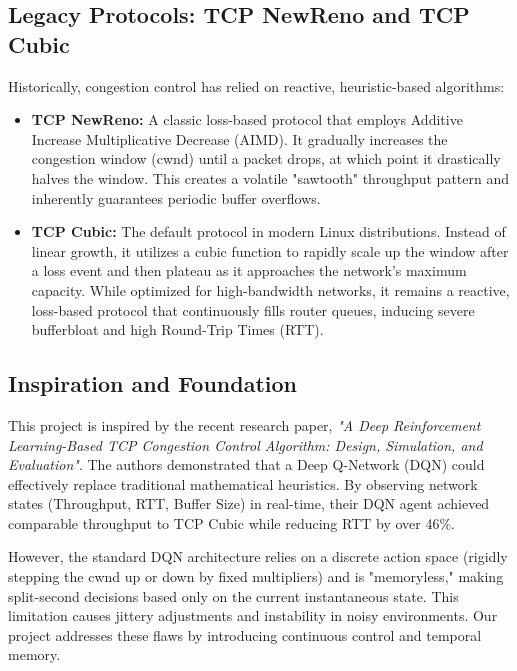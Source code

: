 \documentclass[12pt, a4paper]{article}
\begin{document}
\subsection{Legacy Protocols: TCP NewReno and TCP Cubic}
Historically, congestion control has relied on reactive, heuristic-based algorithms:
\begin{itemize}
    \item \textbf{TCP NewReno:} A classic loss-based protocol that employs Additive Increase Multiplicative Decrease (AIMD). It gradually increases the congestion window (cwnd) until a packet drops, at which point it drastically halves the window. This creates a volatile "sawtooth" throughput pattern and inherently guarantees periodic buffer overflows.
    \item \textbf{TCP Cubic:} The default protocol in modern Linux distributions. Instead of linear growth, it utilizes a cubic function to rapidly scale up the window after a loss event and then plateau as it approaches the network's maximum capacity. While optimized for high-bandwidth networks, it remains a reactive, loss-based protocol that continuously fills router queues, inducing severe bufferbloat and high Round-Trip Times (RTT).
\end{itemize}

\subsection{Inspiration and Foundation}
This project is inspired by the recent research paper, \textit{"A Deep Reinforcement Learning-Based TCP Congestion Control Algorithm: Design, Simulation, and Evaluation"}. The authors demonstrated that a Deep Q-Network (DQN) could effectively replace traditional mathematical heuristics. By observing network states (Throughput, RTT, Buffer Size) in real-time, their DQN agent achieved comparable throughput to TCP Cubic while reducing RTT by over 46\%.

However, the standard DQN architecture relies on a discrete action space (rigidly stepping the cwnd up or down by fixed multipliers) and is "memoryless," making split-second decisions based only on the current instantaneous state. This limitation causes jittery adjustments and instability in noisy environments. Our project addresses these flaws by introducing continuous control and temporal memory.

\clearpage

\end{document}
